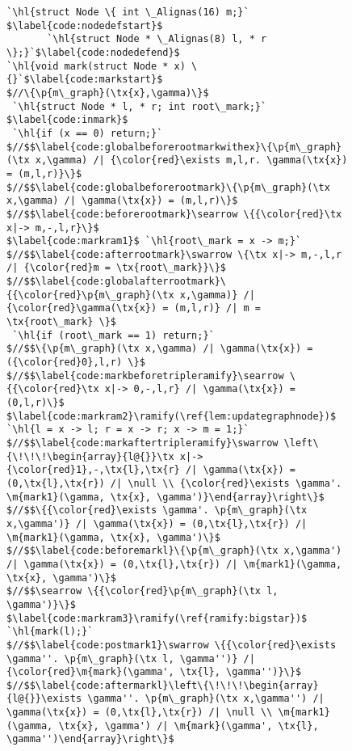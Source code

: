 \renewcommand{\tx}[1]{\scriptsize {\text{#1}}}


\begin{figure}[t]
  \begin{lstlisting}[multicols=2]
`\hl{struct Node \{ int \_Alignas(16) m;}` $\label{code:nodedefstart}$
       `\hl{struct Node * \_Alignas(8) l, * r \};}`$\label{code:nodedefend}$
`\hl{void mark(struct Node * x) \{}`$\label{code:markstart}$
$//\{\p{m\_graph}(\tx{x},\gamma)\}$
 `\hl{struct Node * l, * r; int root\_mark;}` $\label{code:inmark}$
 `\hl{if (x == 0) return;}`
$//$$\label{code:globalbeforerootmarkwithex}\{\p{m\_graph}(\tx x,\gamma) /| {\color{red}\exists m,l,r. \gamma(\tx{x}) = (m,l,r)}\}$
$//$$\label{code:globalbeforerootmark}\{\p{m\_graph}(\tx x,\gamma) /| \gamma(\tx{x}) = (m,l,r)\}$
$//$$\label{code:beforerootmark}\searrow \{{\color{red}\tx x|-> m,-,l,r}\}$
$\label{code:markram1}$ `\hl{root\_mark = x -> m;}`
$//$$\label{code:afterrootmark}\swarrow \{\tx x|-> m,-,l,r /| {\color{red}m = \tx{root\_mark}}\}$
$//$$\label{code:globalafterrootmark}\{{\color{red}\p{m\_graph}(\tx x,\gamma)} /| {\color{red}\gamma(\tx{x}) = (m,l,r)} /| m = \tx{root\_mark} \}$
 `\hl{if (root\_mark == 1) return;}`
$//$$\{\p{m\_graph}(\tx x,\gamma) /| \gamma(\tx{x}) = ({\color{red}0},l,r) \}$
$//$$\label{code:markbeforetripleramify}\searrow \{{\color{red}\tx x|-> 0,-,l,r} /| \gamma(\tx{x}) = (0,l,r)\}$
$\label{code:markram2}\ramify(\ref{lem:updategraphnode})$ `\hl{l = x -> l; r = x -> r; x -> m = 1;}`
$//$$\label{code:markaftertripleramify}\swarrow \left\{\!\!\!\begin{array}{l@{}}\tx x|-> {\color{red}1},-,\tx{l},\tx{r} /| \gamma(\tx{x}) = (0,\tx{l},\tx{r}) /| \null \\ {\color{red}\exists \gamma'. \m{mark1}(\gamma, \tx{x}, \gamma')}\end{array}\right\}$
$//$$\{{\color{red}\exists \gamma'. \p{m\_graph}(\tx x,\gamma')} /| \gamma(\tx{x}) = (0,\tx{l},\tx{r}) /| \m{mark1}(\gamma, \tx{x}, \gamma')\}$
$//$$\label{code:beforemarkl}\{\p{m\_graph}(\tx x,\gamma') /| \gamma(\tx{x}) = (0,\tx{l},\tx{r}) /| \m{mark1}(\gamma, \tx{x}, \gamma')\}$
$//$$\searrow \{{\color{red}\p{m\_graph}(\tx l, \gamma')}\}$
$\label{code:markram3}\ramify(\ref{ramify:bigstar})$ `\hl{mark(l);}`
$//$$\label{code:postmark1}\swarrow \{{\color{red}\exists \gamma''. \p{m\_graph}(\tx l, \gamma'')} /| {\color{red}\m{mark}(\gamma', \tx{l}, \gamma'')}\}$
$//$$\label{code:aftermarkl}\left\{\!\!\!\begin{array}{l@{}}\exists \gamma''. \p{m\_graph}(\tx x,\gamma'') /| \gamma(\tx{x}) = (0,\tx{l},\tx{r}) /| \null \\ \m{mark1}(\gamma, \tx{x}, \gamma') /| \m{mark}(\gamma', \tx{l}, \gamma'')\end{array}\right\}$

\end{lstlisting}
\end{figure}
